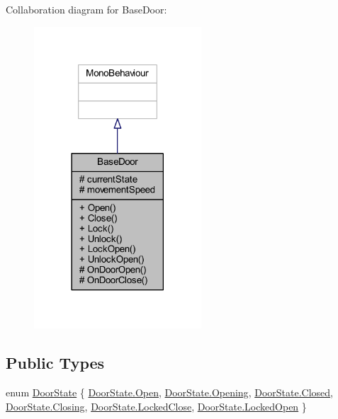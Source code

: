 Collaboration diagram for Base\+Door\+:
\nopagebreak
\begin{figure}[H]
\begin{center}
\leavevmode
\includegraphics[width=177pt]{class_base_door__coll__graph}
\end{center}
\end{figure}
\subsection*{Public Types}
\begin{DoxyCompactItemize}
\item 
enum \mbox{\hyperlink{class_base_door_a22e038571daf23b362eb8aaedc78cb43}{Door\+State}} \{ \newline
\mbox{\hyperlink{class_base_door_a22e038571daf23b362eb8aaedc78cb43ac3bf447eabe632720a3aa1a7ce401274}{Door\+State.\+Open}}, 
\mbox{\hyperlink{class_base_door_a22e038571daf23b362eb8aaedc78cb43a9bd99a0beea48f10663fc4a7d7a33140}{Door\+State.\+Opening}}, 
\mbox{\hyperlink{class_base_door_a22e038571daf23b362eb8aaedc78cb43a03f4a47830f97377a35321051685071e}{Door\+State.\+Closed}}, 
\mbox{\hyperlink{class_base_door_a22e038571daf23b362eb8aaedc78cb43a5c8de6f894682fdb1786037b2040a26e}{Door\+State.\+Closing}}, 
\newline
\mbox{\hyperlink{class_base_door_a22e038571daf23b362eb8aaedc78cb43a79e87b5071e987722119d21ac38e9b0b}{Door\+State.\+Locked\+Close}}, 
\mbox{\hyperlink{class_base_door_a22e038571daf23b362eb8aaedc78cb43ac3c271ab63e95ff3d1b0e1eac01c9e90}{Door\+State.\+Locked\+Open}}
 \}
\end{DoxyCompactItemize}
